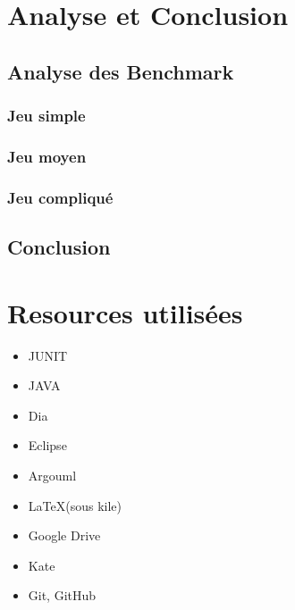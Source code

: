 \documentclass[a4paper,twoside,12pt]{report}
\begin{document}
\chapter{Analyse et Conclusion}
%
\section{Analyse des Benchmark}
%
\subsection{Jeu simple}
%
\subsection{Jeu moyen}
%
\subsection{Jeu compliqué}
%
\section{Conclusion}
%
\newpage
{}


\chapter{Resources utilisées}
\begin{itemize}
 \item JUNIT
 \item JAVA
 \item Dia
 \item Eclipse
 \item Argouml
 \item \LaTeX (sous kile)
 \item Google Drive
 \item Kate
 \item Git, GitHub
\end{itemize}
\end{document}
